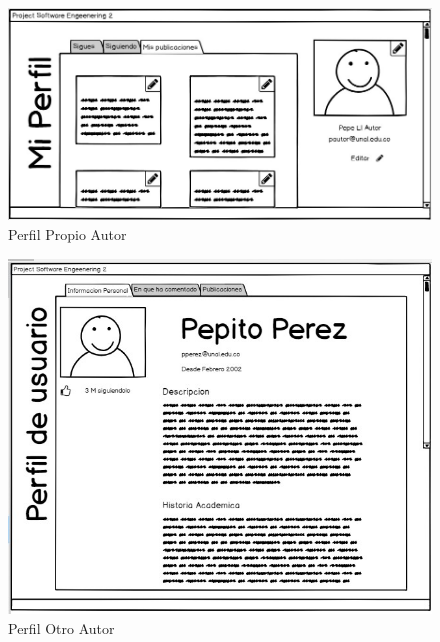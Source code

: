 \documentclass[a4paper,12 pt]{article}
\begin{document}
\begin{figure}[H]
    \centering
    \includegraphics[scale = 1]{images/PerfilPropioAutor.jpg}
    \caption{Perfil Propio Autor}
    \label{F107}
\end{figure}{}

\begin{figure}[H]
    \centering
    \includegraphics[scale = 1.4]{images/PerfilOtroAutor.jpg}
    \caption{Perfil Otro Autor}
    \label{F108}
\end{figure}{}
\end{document}
